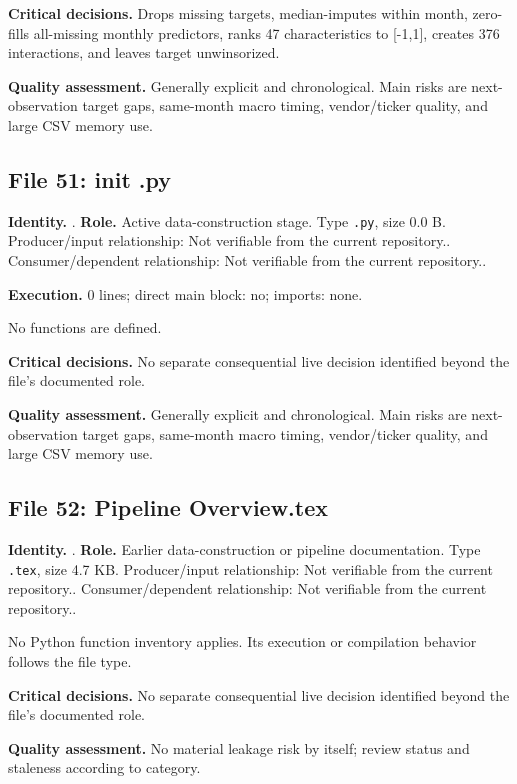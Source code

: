 \documentclass[
  11pt,
  a4paper]{article}
\newcounter{none} %
\begin{document}
\textbf{Critical decisions.} Drops missing targets, median-imputes
within month, zero-fills all-missing monthly predictors, ranks 47
characteristics to {[}-1,1{]}, creates 376 interactions, and leaves
target unwinsorized.

\textbf{Quality assessment.} Generally explicit and chronological. Main
risks are next-observation target gaps, same-month macro timing,
vendor/ticker quality, and large CSV memory use.

\subsection{File 51: init .py}\label{file-3169833220914626355}

\textbf{Identity.} . \textbf{Role.} Active
data-construction stage. Type \texttt{.py}, size 0.0 B. Producer/input
relationship: Not verifiable from the current repository..
Consumer/dependent relationship: Not verifiable from the current
repository..

\textbf{Execution.} 0 lines; direct main block: no; imports: none.

No functions are defined.

\textbf{Critical decisions.} No separate consequential live decision
identified beyond the file's documented role.

\textbf{Quality assessment.} Generally explicit and chronological. Main
risks are next-observation target gaps, same-month macro timing,
vendor/ticker quality, and large CSV memory use.

\subsection{File 52: Pipeline
Overview.tex}\label{file-6446115745653604091}

\textbf{Identity.} .
\textbf{Role.} Earlier data-construction or pipeline documentation. Type
\texttt{.tex}, size 4.7 KB. Producer/input relationship: Not verifiable
from the current repository.. Consumer/dependent relationship: Not
verifiable from the current repository..

No Python function inventory applies. Its execution or compilation
behavior follows the file type.

\textbf{Critical decisions.} No separate consequential live decision
identified beyond the file's documented role.

\textbf{Quality assessment.} No material leakage risk by itself; review
status and staleness according to category.
\end{document}
